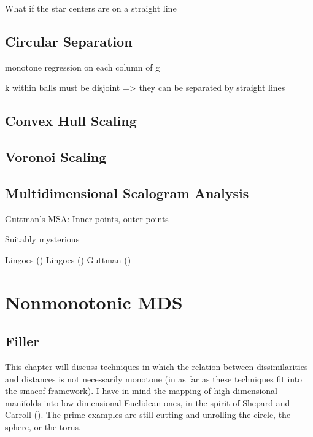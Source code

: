 \documentclass[
  12pt,
  letterpaper,
  DIV=11,
  numbers=noendperiod]{scrreprt}
\theoremstyle{remark}
\begin{document}
What if the star centers are on a straight line

\section{Circular Separation}\label{circular-separation}

monotone regression on each column of g

k within balls must be disjoint =\textgreater{} they can be separated by
straight lines

\section{Convex Hull Scaling}\label{convex-hull-scaling}

\section{Voronoi Scaling}\label{voronoi-scaling}

\section{Multidimensional Scalogram
Analysis}\label{multidimensional-scalogram-analysis}

Guttman's MSA: Inner points, outer points

Suitably mysterious

Lingoes () Lingoes
() Guttman
()


\chapter{Nonmonotonic MDS}\label{nonmonotonic}

\section{Filler}\label{filler}

This chapter will discuss techniques in which the relation between
dissimilarities and distances is not necessarily monotone (in as far as
these techniques fit into the smacof framework). I have in mind the
mapping of high-dimensional manifolds into low-dimensional Euclidean
ones, in the spirit of Shepard and Carroll
(). The prime examples are still
cutting and unrolling the circle, the sphere, or the torus.
\end{document}

